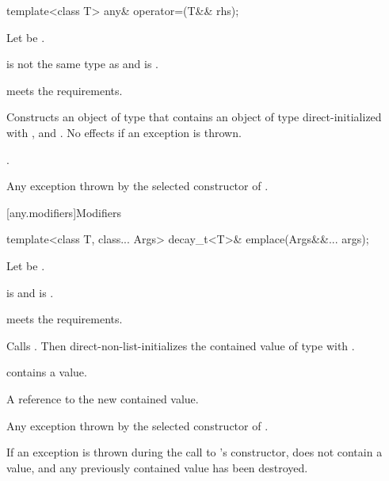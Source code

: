 %
\begin{itemdecl}
template<class T>
  any& operator=(T&& rhs);
\end{itemdecl}

\begin{itemdescr}
\pnum
Let  be .

\pnum
\constraints
{} is not the same type as  and
 is .

\pnum
\expects
{} meets the  requirements.

\pnum
\effects
Constructs an object  of type  that contains an object of type  direct-initialized with , and .
No effects if an exception is thrown.

\pnum
\returns
{}.

\pnum
\throws
Any exception thrown by the selected constructor of .
\end{itemdescr}

[any.modifiers]{Modifiers}

%
\begin{itemdecl}
template<class T, class... Args>
  decay_t<T>& emplace(Args&&... args);
\end{itemdecl}

\begin{itemdescr}
\pnum
Let  be .

\pnum
\constraints
{} is  and
 is .

\pnum
\expects
{} meets the  requirements.

\pnum
\effects
Calls .
Then direct-non-list-initializes the contained value of type 
with .

\pnum
\ensures
{} contains a value.

\pnum
\returns
A reference to the new contained value.

\pnum
\throws
Any exception thrown by the selected constructor of .

\pnum
\remarks
If an exception is thrown during the call to 's constructor,
 does not contain a value, and any previously contained value
has been destroyed.
\end{itemdescr}

